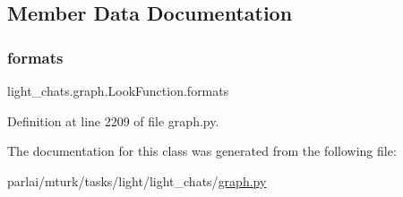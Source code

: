 \subsection{Member Data Documentation}
\mbox{\label{classlight__chats_1_1graph_1_1LookFunction_a98ca1312bcaf009a34ee3e1b1b43a3d6}} 
\subsubsection{\texorpdfstring{formats}{formats}}
{\footnotesize\ttfamily light\+\_\+chats.\+graph.\+Look\+Function.\+formats}



Definition at line 2209 of file graph.\+py.



The documentation for this class was generated from the following file\+:\begin{DoxyCompactItemize}
\item 
parlai/mturk/tasks/light/light\+\_\+chats/\hyperlink{parlai_2mturk_2tasks_2light_2light__chats_2graph_8py}{graph.\+py}\end{DoxyCompactItemize}
